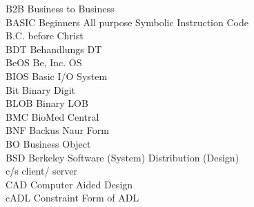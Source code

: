 \begin{tabbing}
    \>B2B \>\>Business to Business\\

    \>BASIC \>\>Beginners All purpose Symbolic Instruction Code\\

    \>B.C. \>\>before Christ\\



    \>BDT \>\>Behandlungs DT\\

    \>BeOS \>\>Be, Inc. OS\\


    \>BIOS \>\>Basic I/O System\\

    \>Bit \>\>Binary Digit\\

    \>BLOB \>\>Binary LOB\\

    \>BMC \>\>BioMed Central\\

    \>BNF \>\>Backus Naur Form\\

    \>BO \>\>Business Object\\


    \>BSD \>\>Berkeley Software (System) Distribution (Design)\\



    \>c/s \>\>client/ server\\



    \>CAD \>\>Computer Aided Design\\

    \>cADL \>\>Constraint Form of ADL\\


\end{tabbing}
